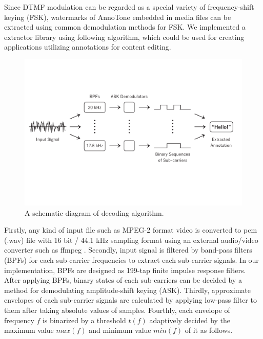 Since DTMF modulation can be regarded as a special variety of frequency-shift keying (FSK), watermarks of AnnoTone embedded in media files can be extracted using common demodulation methods for FSK.
We implemented a extractor library using following algorithm, which could be used for creating applications utilizing annotations for content editing.

\begin{figure}[htbp]
 \begin{center}
  \vspace{5mm}
  \includegraphics[width=130mm]{implementation_decode.pdf}
 \end{center}
 \caption{A schematic diagram of decoding algorithm.}
 \label{fig:impl_decd}
\end{figure}

Firstly, any kind of input file such as MPEG-2 format video is converted to pcm (.wav) file with 16 bit / 44.1 kHz sampling format using an external audio/video converter such as ffmpeg \cite{ffmpeg}.
Secondly, input signal is filtered by band-pass filters (BPFs) for each sub-carrier frequencies to extract each sub-carrier signals.
In our implementation, BPFs are designed as 199-tap finite impulse response filters.
After applying BPFs, binary states of each sub-carriers can be decided by a method for demodulating amplitude-shift keying (ASK).
Thirdly, approximate envelopes of each sub-carrier signals are calculated by applying low-pass filter to them after taking absolute values of samples.
Fourthly, each envelope of frequency $f$ is binarized by a threshold $t(f)$ adaptively decided by the maximum value $max(f)$ and minimum value $min(f)$ of it as follows.

